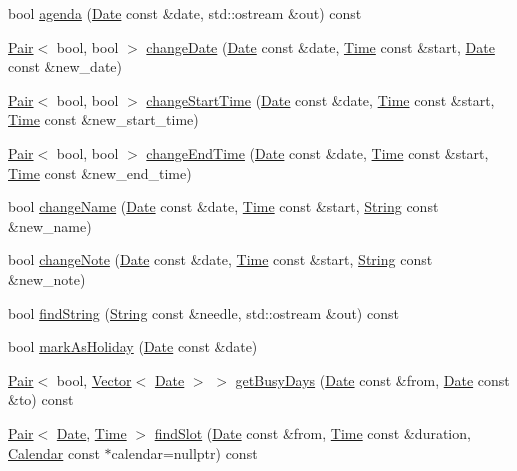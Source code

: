 \begin{DoxyCompactItemize}
\item 
bool \hyperlink{classProgram_a36916661bfce488ed07dbc2a7f3fadce}{agenda} (\hyperlink{classDate}{Date} const \&date, std\+::ostream \&out) const
\item 
\hyperlink{structPair}{Pair}$<$ bool, bool $>$ \hyperlink{classProgram_a4a25f61fe0747f0f13ace13b310ed7a3}{change\+Date} (\hyperlink{classDate}{Date} const \&date, \hyperlink{classTime}{Time} const \&start, \hyperlink{classDate}{Date} const \&new\+\_\+date)
\item 
\hyperlink{structPair}{Pair}$<$ bool, bool $>$ \hyperlink{classProgram_afb92c7d470233331feb450698ea66531}{change\+Start\+Time} (\hyperlink{classDate}{Date} const \&date, \hyperlink{classTime}{Time} const \&start, \hyperlink{classTime}{Time} const \&new\+\_\+start\+\_\+time)
\item 
\hyperlink{structPair}{Pair}$<$ bool, bool $>$ \hyperlink{classProgram_a8038bf54fd0e358c48d02ced033b6848}{change\+End\+Time} (\hyperlink{classDate}{Date} const \&date, \hyperlink{classTime}{Time} const \&start, \hyperlink{classTime}{Time} const \&new\+\_\+end\+\_\+time)
\item 
bool \hyperlink{classProgram_a606ccb02438885b2894843613d6de157}{change\+Name} (\hyperlink{classDate}{Date} const \&date, \hyperlink{classTime}{Time} const \&start, \hyperlink{classString}{String} const \&new\+\_\+name)
\item 
bool \hyperlink{classProgram_a63f49d8259cb4038274a1cb6e9b82374}{change\+Note} (\hyperlink{classDate}{Date} const \&date, \hyperlink{classTime}{Time} const \&start, \hyperlink{classString}{String} const \&new\+\_\+note)
\item 
bool \hyperlink{classProgram_af80c02ad4f189ee0d6c67ccc7efdc814}{find\+String} (\hyperlink{classString}{String} const \&needle, std\+::ostream \&out) const
\item 
bool \hyperlink{classProgram_ad14086e73ec4aef58c705e3a19089d97}{mark\+As\+Holiday} (\hyperlink{classDate}{Date} const \&date)
\item 
\hyperlink{structPair}{Pair}$<$ bool, \hyperlink{classVector}{Vector}$<$ \hyperlink{classDate}{Date} $>$ $>$ \hyperlink{classProgram_af91512a81cffe079b6c300f47df906e8}{get\+Busy\+Days} (\hyperlink{classDate}{Date} const \&from, \hyperlink{classDate}{Date} const \&to) const
\item 
\hyperlink{structPair}{Pair}$<$ \hyperlink{classDate}{Date}, \hyperlink{classTime}{Time} $>$ \hyperlink{classProgram_a639a0af6603bda2f6dc8ec051fd1dd93}{find\+Slot} (\hyperlink{classDate}{Date} const \&from, \hyperlink{classTime}{Time} const \&duration, \hyperlink{classCalendar}{Calendar} const $\ast$calendar=nullptr) const

\end{DoxyCompactItemize}
